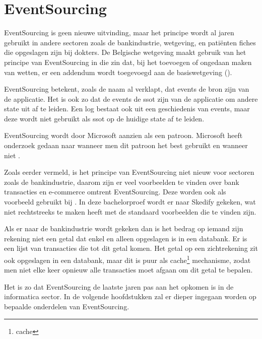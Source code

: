 
\chapter{EventSourcing}
\label{ch:eventsourcing}

EventSourcing is geen nieuwe uitvinding, maar het principe wordt al jaren gebruikt in andere sectoren zoals de bankindustrie, wetgeving, en patiënten fiches die opgeslagen zijn bij dokters. De Belgische wetgeving maakt gebruik van het principe van EventSourcing in die zin dat, bij het toevoegen of ongedaan maken van wetten, er een addendum wordt toegevoegd aan de basiswetgeving (\cite{belgischewetgeving}).

EventSourcing betekent, zoals de naam al verklapt, dat events de bron zijn van de applicatie. Het is ook zo dat de events de \gls{ssot} zijn van de applicatie om andere state uit af te leiden. Een log bestaat ook uit een geschiedenis van events, maar deze wordt niet gebruikt als \gls{ssot} op de huidige state af te leiden.

EventSourcing wordt door Microsoft aanzien als een patroon. Microsoft heeft onderzoek gedaan naar wanneer men dit patroon het best gebruikt en wanneer niet \autocite{Microsoft2017ES}.

Zoals eerder vermeld, is het principe van EventSourcing niet nieuw voor sectoren zoals de bankindustrie, daarom zijn er veel voorbeelden te vinden over bank transacties en e-commerce omtrent EventSourcing. Deze worden ook als voorbeeld gebruikt bij \textcite{Microsoft2017ES}. In deze bachelorproef wordt er naar Skedify gekeken, wat niet rechtstreeks te maken heeft met de standaard voorbeelden die te vinden zijn.

Als er naar de bankindustrie wordt gekeken dan is het bedrag op iemand zijn rekening niet een getal dat enkel en alleen opgeslagen is in een databank. Er is een lijst van transacties die tot dit getal komen. Het getal op een zichtrekening zit ook opgeslagen in een databank, maar dit is puur als \gls{cache}\footnote{\glsdesc{cache}} mechanisme, zodat men niet elke keer opnieuw alle transacties moet afgaan om dit getal te bepalen.

Het is zo dat EventSourcing de laatste jaren pas aan het opkomen is in de informatica sector. In de volgende hoofdstukken zal er dieper ingegaan worden op bepaalde onderdelen van EventSourcing.